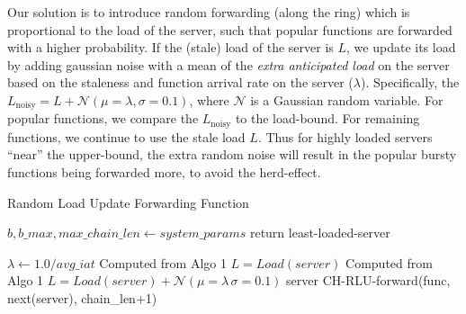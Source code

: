 Our solution is to introduce random forwarding (along the ring) which is proportional to the load of the server, such that popular functions are forwarded with a higher probability. 
If the (stale) load of the server is $L$, we update its load by adding gaussian noise with a mean of the \emph{extra anticipated load} on the server based on the staleness and function arrival rate on the server ($\lambda$).
Specifically, the $L_{\text{noisy}}=L+\mathcal{N}(\mu=\lambda, \sigma=0.1)$, where $\mathcal{N}$ is a Gaussian random variable. 
For popular functions, we  compare the $L_{\text{noisy}}$ to the load-bound.
For remaining functions, we continue to use the stale load $L$. 
Thus for highly loaded servers ``near'' the upper-bound, the extra random noise will result in the popular bursty functions being forwarded more, to avoid the herd-effect.

\begin{comment}
To achieve this, we introduce Gaussian noise to the forwarding decision.
We compute the global arrival rate, then estimate the per-server arrival rate and the effect an invocation has on server load, following the steps in Algorithm~\ref{algo:PopularRLUPolicy}.
For each server we then sample noise from the normal distribution whos mean is centered on the \textit{extra\_anticip\_load}, and add that to the server's tracked load to get \textit{Lnoise}.
We iterate along the ring of servers until we find one with a \textit{Lnoise} less than the global \textit{bounded\_ceil}.
In the case where we skip over 3 servers, we assume that the invocation will run cold no matter what, and assign it to the least loaded server.
\end{comment}


\begin{algorithm}
  \caption{Random Load Update Forwarding Function}
  \begin{algorithmic}[1]
    \State $b, b\_max, max\_chain\_len \gets system\_params $
    \State return least-loaded-server
    \EndIf 

    \State $\lambda \gets 1.0 / avg\_iat$ \Comment Computed from Algo 1
     \State $L=Load(server)$
     \Comment Computed from Algo 1 
         \State $L = Load(server) + \mathcal{N}(\mu=\lambda\,\sigma=0.1)$
    \EndIf 
       \State server
\Else \State CH-RLU-forward(func, next(server), chain\_len+1)
       \EndIf
    \end{algorithmic}
\label{algo:PopularRLUPolicy}
\end{algorithm}

